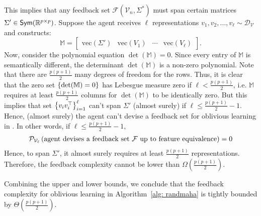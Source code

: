 This implies that any feedback set \( \mathcal{F}(\mathcal{V}_n, \Sigma^*) \) must span certain matrices \( \Sigma' \in \textsf{Sym}(\mathbb{R}^{p\times p}) \). Suppose the agent receives \( \ell \) representations \( v_1, v_2, \ldots, v_{\ell} \sim \mathcal{D}_{\mathcal{V}} \) and constructs:
\[
\mathbb{M} = \begin{bmatrix} \text{vec}(\Sigma') & \text{vec}(V_1) & \cdots & \text{vec}(V_\ell) \end{bmatrix}.
\]
Now, consider the polynomial equation $\det(\mathbb{M}) = 0$. Since every entry of $\mathbb{M}$ is semantically different, the determinant $\det(\mathbb{M})$ is a non-zero polynomial. Note that there are $\frac{p(p+1)}{2}$ many degrees of freedom for the rows. Thus, it is clear that the zero set $\left\{\det(\mathbb{M}) = 0\right\}$ has Lebesgue measure zero if $\ell < \frac{p(p+1)}{2}$, i.e. $\mathbb{M}$ requires at least $\frac{p(p+1)}{2}$ columns for $\det(\mathbb{M})$ to be identically zero. But this implies that set $\left\{v_iv_i^{\top}\right\}_{i=1}^\ell$ can't span $\Sigma'$ (almost surely) if $\ell \le \frac{p(p+1)}{2} - 1$.
Hence, (almost surely) the agent can't devise a feedback set for oblivious learning in .
In other words, if $\ell \le \frac{p(p+1)}{2} - 1$,
\begin{align*}
    {\mathcal{P}}_{{\mathcal{V}}_\ell} \left( { \textnormal{agent devises} \textnormal{ a feedback set } {\mathcal{F}} \textnormal{ up to feature equivalence}} \right)  = 0
\end{align*}
Hence, to span \( \Sigma' \), it almost surely requires at least \( \frac{p(p+1)}{2} \) representations. Therefore, the feedback complexity cannot be lower than \( \Omega\left(\frac{p(p+1)}{2}\right) \).

Combining the upper and lower bounds, we conclude that the feedback complexity for oblivious learning in Algorithm~\ref{alg: randmaha} is tightly bounded by \( \Theta\left(\frac{p(p+1)}{2}\right) \).



